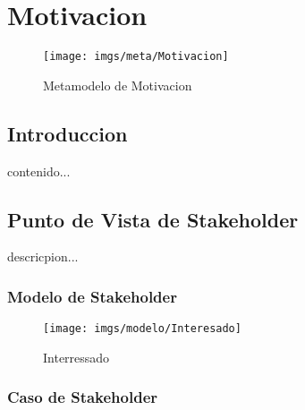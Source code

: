 \chapter{Motivacion}
\begin{figure}[h!]
	\centering
	\texttt{[image: imgs/meta/Motivacion]}
	\caption{Metamodelo de Motivacion}
\end{figure}

\section{Introduccion}

contenido...
\newpage
\section{Punto de Vista de Stakeholder }
descricpion...
\subsection{Modelo de Stakeholder}
\begin{figure}[h!]
	\centering
	\texttt{[image: imgs/modelo/Interesado]}
	\caption{Interressado}
\end{figure}
\newpage

\subsection{Caso de Stakeholder}

\newpage